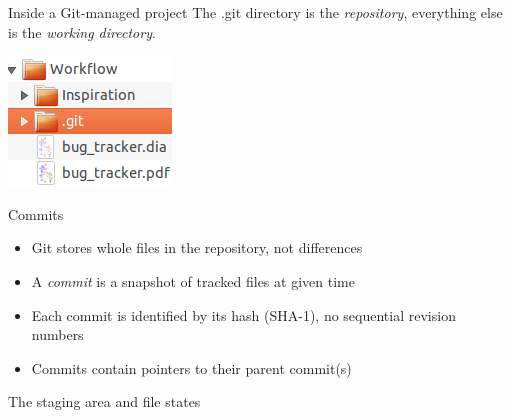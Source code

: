 \documentclass{beamer}
\begin{document}
\begin{frame}{Inside a Git-managed project}
The .git directory is the \emph{repository}, everything else is the \emph{working directory}.
  \begin{center}
    \includegraphics{images/directory_structure.png}
  \end{center}
\end{frame}

\begin{frame}{Commits}
  \begin{itemize}
  \item Git stores whole files in the repository, not differences
  \item A \emph{commit} is a snapshot of tracked files at given time
  \item Each commit is identified by its hash (SHA-1), no sequential revision numbers
  \item Commits contain pointers to their parent commit(s)
  \end{itemize}
\end{frame}

\begin{frame}{The staging area and file states}
  \begin{center}
  \end{center}
\end{frame}
\end{document}
